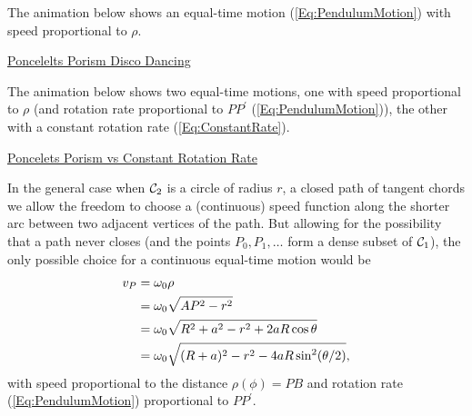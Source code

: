 \documentclass{ximera}
\begin{document}
\begin{exploration}
The animation below shows an equal-time motion (\ref{Eq:PendulumMotion}) with speed proportional to $\rho$.
\begin{onlineOnly}
    \begin{center}
\end{center}
\end{onlineOnly}

\href{https://www.desmos.com/calculator/g2o1szpkh5}{Poncelelts Porism Disco Dancing}
\end{exploration}

\begin{exploration}
The animation below shows two equal-time motions, one with speed proportional to $\rho$ (and rotation rate proportional to $PP^\prime$ (\ref{Eq:PendulumMotion})), the other with a constant rotation rate (\ref{Eq:ConstantRate}). 
\begin{onlineOnly}
    \begin{center}
\end{center}
\end{onlineOnly}

\href{https://www.desmos.com/calculator/xifdeg3wsq}{Poncelets Porism vs Constant Rotation Rate}

\end{exploration}



In the general case when ${\cal C}_2$ is a circle of radius $r$, a closed path of tangent chords we allow the freedom to choose a (continuous) speed function along the shorter arc between two adjacent vertices of the path. But allowing for the possibility that a path never closes (and the points $P_0, P_1, \ldots$ form a dense subset of ${\cal C}_1$), the only possible choice for a continuous equal-time motion would be
\begin{align}
    v_P  &= \omega_0 \rho   \notag  \\ 
          &= \omega_0 \sqrt{AP^2 - r^2}  \notag \\
          &= \omega_0 \sqrt{R^2 + a^2 - r^2 + 2aR \cos\theta} \notag \\
          &= \omega_0  \sqrt{(R+a)^2 - r^2 - 4aR\sin^2 (\theta/2)}, \label{Eq:EqualTime8}
\end{align}
with speed proportional to the distance $\rho(\phi) = PB$ and rotation rate (\ref{Eq:PendulumMotion}) proportional to $PP^\prime$.

\begin{onlineOnly}
    \begin{center}
\end{center}
\end{onlineOnly}
\end{document}
